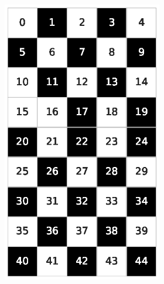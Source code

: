 \begin{figure}[h!]
\begin{subfigure}[b]{\textwidth}
\begin{subfigure}[b]{0.20\textwidth}
            \includegraphics[width=\columnwidth]{images/Tai45c_9x5_50.eps}
        \end{subfigure}
        \hspace{3em}
        \begin{subfigure}[b]{0.20\textwidth}

\end{subfigure}
\end{subfigure}
\end{figure}
